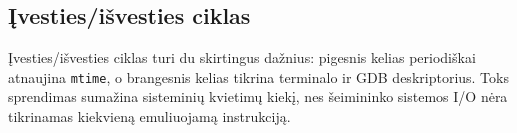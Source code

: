 \subsection{Įvesties/išvesties ciklas}
\label{sec:ivestis-isvestis}

Įvesties/išvesties ciklas turi du skirtingus dažnius: pigesnis kelias periodiškai atnaujina \texttt{mtime}, o brangesnis kelias tikrina terminalo ir GDB deskriptorius. Toks sprendimas sumažina sisteminių kvietimų kiekį, nes šeimininko sistemos I/O nėra tikrinamas kiekvieną emuliuojamą instrukciją.
